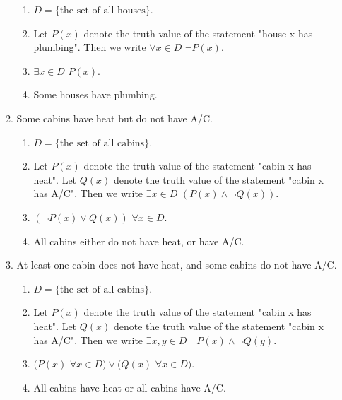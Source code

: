 \documentclass[10pt]{article}
\theoremstyle{plain}
\theoremstyle{definition}
\begin{document}
\begin{enumerate}
\begin{enumerate}
\begin{enumerate}
\item $D = \{\text{the set of all houses}\}$.

\item Let $P(x)$ denote the truth value of the statement "house x has plumbing". Then we write $\forall x \in D$ $\neg P(x)$. 

\item $\exists x \in D$ $P(x)$. 

\item Some houses have plumbing. 
\end{enumerate}

\item Some cabins have heat but do not have A/C. 

\begin{enumerate}
\item $D = \{\text{the set of all cabins}\}$.

\item Let $P(x)$ denote the truth value of the statement "cabin x has heat". Let $Q(x)$ denote the truth value of the statement "cabin x has A/C". Then we write $\exists x \in D$  $(P(x) \wedge \neg Q(x))$. 

\item $(\neg P(x) \vee Q(x))$ $\forall x \in D$. 

\item All cabins either do not have heat, or have A/C. 
\end{enumerate}

\item At least one cabin does not have heat, and some cabins do not have A/C. 

\begin{enumerate}
\item $D = \{\text{the set of all cabins}\}$.

\item Let $P(x)$ denote the truth value of the statement "cabin x has heat". Let $Q(x)$ denote the truth value of the statement "cabin x has A/C". Then we write $\exists x,y \in D$ $\neg P(x) \wedge \neg Q(y)$. 

\item $ (P(x)$ $\forall x \in D) \vee (Q(x) $ $\forall x \in D)$. 

\item All cabins have heat or all cabins have A/C. 

\end{enumerate}


\end{enumerate}
\end{enumerate}
\end{document}
